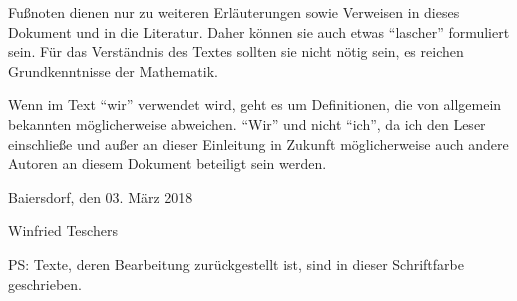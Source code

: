 Fußnoten dienen nur zu weiteren Erläuterungen sowie Verweisen in dieses Dokument und in die Literatur.
Daher können sie auch etwas "`lascher"' formuliert sein.
Für das Verständnis des Textes sollten sie nicht nötig sein, es reichen Grundkenntnisse der Mathematik.

Wenn im Text "`wir"' verwendet wird, geht es um Definitionen, die von allgemein bekannten möglicherweise abweichen.
"`Wir"' und nicht "`ich"', da ich den Leser einschließe und außer an dieser Einleitung in Zukunft möglicherweise auch andere Autoren an diesem Dokument beteiligt sein werden.

\bigskip

Baiersdorf, den 03. März 2018

Winfried Teschers

\color{gray}%
\bigskip

PS: Texte, deren Bearbeitung zurückgestellt ist, sind in dieser Schriftfarbe geschrieben.
\color{black}%
